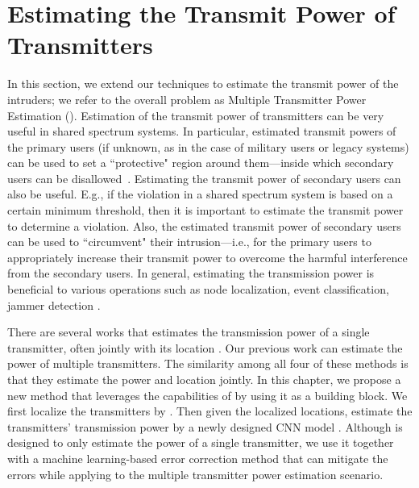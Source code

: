 \section{Estimating the Transmit Power of Transmitters}
\label{sec:power}

In this section, we extend our techniques to estimate the transmit power of the
intruders; we refer to the overall problem as  Multiple Transmitter Power Estimation (\mtpe). Estimation of the transmit power of transmitters can be very useful in shared
spectrum systems. In particular, estimated transmit powers of the primary users (if unknown, as in the case of military users or legacy systems) can be used to set a
``protective" region around them---inside which secondary users can be disallowed~\cite{Ureten2011powerlocation}.
Estimating the transmit power of secondary users can also be useful. E.g., if the violation
in a shared spectrum system is based on a certain minimum threshold, then it is important to estimate the transmit power to determine a violation. 
Also, the estimated transmit power of secondary users can be used to ``circumvent" their intrusion---i.e., for the primary users to appropriately increase their transmit power to overcome the harmful interference from the secondary users. 
In general, estimating the transmission power is beneficial to various operations such as node localization, event classification, jammer detection \cite{PowerEstimate2010Zafer}.
 
There are several works that estimates the transmission power of a single transmitter, often jointly with its location \cite{PowerEstimate2010Zafer, Ureten2011powerlocation, icoin2007-powerposition}.
Our previous work \cite{ipsn20-mtl} can estimate the power of multiple transmitters.
The similarity among all four of these methods is that they estimate the power and location jointly.
In this chapter, we propose a new method that leverages the capabilities of \our by using it as a building block. We first localize the transmitters by \our. 
Then given the localized locations, estimate the transmitters' transmission power by a newly designed CNN model \power. 
Although \power is designed to only estimate the power of a single transmitter, we use it together with a machine learning-based error correction method that can mitigate the errors while applying \power to the multiple transmitter power estimation scenario.

